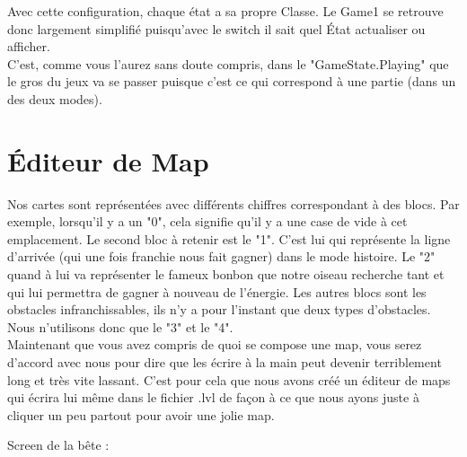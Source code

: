 \documentclass [11pt]{report}
\begin{document}
		\vspace{10mm}
		
		Avec cette configuration, chaque état a sa propre Classe. Le Game1 se retrouve donc largement simplifié puisqu'avec le switch il sait quel État actualiser ou afficher.\\
		
			
		C'est, comme vous l'aurez sans doute compris, dans le "GameState.Playing" que le gros du jeux va se passer puisque c'est ce qui correspond à une partie (dans un des deux modes).
		
		
		\vspace{10mm}
		\newpage
		
		
		
	\section{\'Editeur de Map}
						
			Nos cartes sont représentées avec différents chiffres correspondant à des blocs. Par exemple, lorsqu'il y a un "0", cela signifie qu'il y a une case de vide à cet emplacement. Le second bloc à retenir est le "1". C'est lui qui représente la ligne d'arrivée (qui une fois franchie nous fait gagner) dans le mode histoire. Le "2" quand à lui va représenter le fameux bonbon que notre oiseau recherche tant et qui lui permettra de gagner à nouveau de l'énergie. Les autres blocs sont les obstacles infranchissables, ils n'y a pour l'instant que deux types d'obstacles. Nous n'utilisons donc que le "3" et le "4".\\
			
			\indent Maintenant que vous avez compris de quoi se compose une map, vous serez d'accord avec nous pour dire que les écrire à la main peut devenir terriblement long et très vite lassant. C'est pour cela que nous avons créé un éditeur de maps qui écrira lui même dans le fichier .lvl de façon à ce que nous ayons juste à cliquer un peu partout pour avoir une jolie map.
			
			\vspace{10mm}
			
	\noindent Screen de la bête : 
						
		\vspace{4mm}
		
\end{document}
